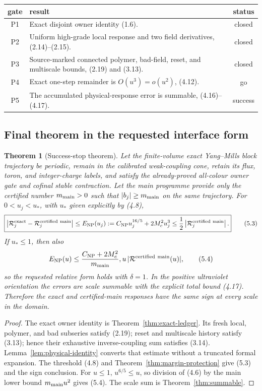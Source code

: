 \documentclass[11pt]{article}
\newtheorem{theorem}{Theorem}[section]
\theoremstyle{definition}
\theoremstyle{remark}
\newcommand{\cR}{\mathcal R}
\begin{document}
\begin{center}
\begin{tabular}{c|p{}|c}
gate&result&status\\ \hline
P1&Exact disjoint owner identity (1.6).&closed\\
P2&Uniform high-grade local response and two field derivatives,
      (2.14)--(2.15).&closed\\
P3&Source-marked connected polymer, bad-field, reset, and
      multiscale bounds, (2.19) and (3.13).&closed\\
P4&Exact one-step remainder is $O(u^3)=o(u^2)$, (4.12).&go\\
P5&The accumulated physical-response error is summable,
      (4.16)--(4.17).&success
\end{tabular}
\end{center}

\subsection{Final theorem in the requested interface form}

\begin{theorem}[Success-stop theorem]
\label{thm:success-stop}
Let the finite-volume exact Yang--Mills block trajectory be periodic, remain in
the calibrated weak-coupling cone, retain its flux, toron, and integer-charge
labels, and satisfy the already-proved all-colour owner gate and cofinal stable
contraction.  Let the main programme provide only the certified number
$m_{\rm main}>0$ such that
$|b_j|\ge m_{\rm main}$ on the same trajectory.  For $0<u_j<u_*$, with
$u_*$ given explicitly by (4.8),
\[
\boxed{
 \left|\cR_j^{\rm exact}-\cR_j^{\rm certified\ main}\right|
 \le E_{\rm NP}(u_j)
 :=C_{\rm NP}u_j^{16/5}+2M_c^2u_j^3
 \le\frac12\left|\cR_j^{\rm certified\ main}\right|.}  \tag{5.3}
\]
If $u_*\le1$, then also
\[
 E_{\rm NP}(u)
 \le
 \frac{C_{\rm NP}+2M_c^2}{m_{\rm main}},
 u\,|\cR^{\rm certified\ main}(u)|,                       \tag{5.4}
\]
so the requested relative form holds with $\delta=1$.  In the positive
ultraviolet orientation the errors are scale summable with the explicit total
bound (4.17).  Therefore the exact and certified-main responses have the same
sign at every scale in the domain.
\end{theorem}

\begin{proof}
The exact owner identity is Theorem~\ref{thm:exact-ledger}.  Its fresh
local, polymer, and bad subseries satisfy (2.19); reset and multiscale history
satisfy (3.13); hence their exhaustive inverse-coupling sum satisfies (3.14).
Lemma~\ref{lem:physical-identity} converts that estimate without a truncated
formal expansion.  The threshold (4.8) and
Theorem~\ref{thm:margin-protection} give (5.3) and the sign conclusion.
For $u\le1$, $u^{6/5}\le u$, so division of (4.6) by the main lower bound
$m_{\rm main}u^2$ gives (5.4).  The scale sum is
Theorem~\ref{thm:summable}.
\end{proof}
\end{document}

